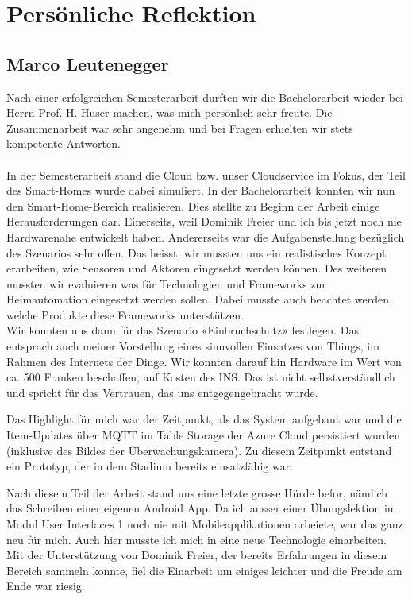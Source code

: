 \pagebreak
\section{Persönliche Reflektion}

\subsection*{Marco Leutenegger}
Nach einer erfolgreichen Semesterarbeit durften wir die Bachelorarbeit wieder bei Herrn Prof. H. Huser machen, was mich persönlich sehr freute. Die Zusammenarbeit war sehr angenehm und bei Fragen erhielten wir stets kompetente Antworten.\\ \\
In der Semesterarbeit stand die Cloud bzw. unser Cloudservice im Fokus, der Teil des Smart-Homes wurde dabei simuliert. In der Bachelorarbeit konnten wir nun den Smart-Home-Bereich realisieren. Dies stellte zu Beginn der Arbeit einige Herausforderungen dar. Einerseits, weil Dominik Freier und ich bis jetzt noch nie Hardwarenahe entwickelt haben. Andererseits war die Aufgabenstellung bezüglich des Szenarios sehr offen. Das heisst, wir mussten uns ein realistisches Konzept erarbeiten, wie Sensoren und Aktoren eingesetzt werden können. Des weiteren mussten wir evaluieren was für Technologien und Frameworks zur Heimautomation eingesetzt werden sollen. Dabei musste auch beachtet werden, welche Produkte diese Frameworks unterstützen. \\
Wir konnten uns dann für das Szenario «Einbruchschutz» festlegen. Das entsprach auch meiner Vorstellung eines sinnvollen Einsatzes von Things, im Rahmen des Internets der Dinge. Wir konnten darauf hin Hardware im Wert von ca. 500 Franken beschaffen, auf Kosten des INS. Das ist nicht selbstverständlich und spricht für das Vertrauen, das uns entgegengebracht wurde.

Das Highlight für mich war der Zeitpunkt, als das System aufgebaut war und die Item-Updates über MQTT im Table Storage der Azure Cloud persistiert wurden (inklusive des Bildes der Überwachungskamera). Zu diesem Zeitpunkt entstand ein Prototyp, der in dem Stadium bereits einsatzfähig war.

Nach diesem Teil der Arbeit stand uns eine letzte grosse Hürde befor, nämlich das Schreiben einer eigenen Android App. Da ich ausser einer Übungslektion im Modul User Interfaces 1 noch nie mit Mobileapplikationen arbeiete, war das ganz neu für mich. Auch hier musste ich mich in eine neue Technologie einarbeiten. Mit der Unterstützung von Dominik Freier, der bereits Erfahrungen in diesem Bereich sammeln konnte, fiel die Einarbeit um einiges leichter und die Freude am Ende war riesig.

